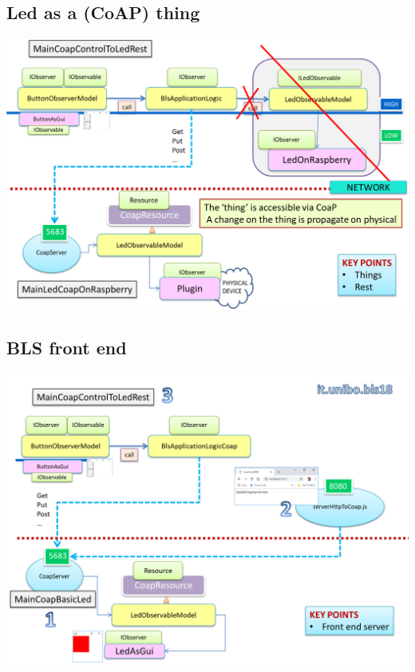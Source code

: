 \documentclass[10pt,a4paper,openright,twoside]{C:/Didattica/git/lab2014Bo/it.unibo.iss2015intro/docsInternal/contents/llncs}
\begin{document}


\subsection{Led as a (CoAP) thing }

\medskip 
\includegraphics[scale = 0.5]{img/bls18/bls18CoapBL.png}


\subsection{BLS front end }

\medskip 
\includegraphics[scale = 0.5]{img/bls18/bls18CoapFrontEnd.png}

 
\end{document}
